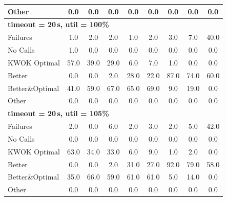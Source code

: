 \begin{tabular}{l cccccccc}
Other & 0.0 & 0.0 & 0.0 & 0.0 & 0.0 & 0.0 & 0.0 & 0.0 \\
\midrule
\multicolumn{9}{l}{\textbf{timeout = 20\,s, util = 100\%}} \\
\midrule
Failures & 1.0 & 2.0 & 2.0 & 1.0 & 2.0 & 3.0 & 7.0 & 40.0 \\
No Calls & 1.0 & 0.0 & 0.0 & 0.0 & 0.0 & 0.0 & 0.0 & 0.0 \\
KWOK Optimal & 57.0 & 39.0 & 29.0 & 6.0 & 7.0 & 1.0 & 0.0 & 0.0 \\
Better & 0.0 & 0.0 & 2.0 & 28.0 & 22.0 & 87.0 & 74.0 & 60.0 \\
Better\&Optimal & 41.0 & 59.0 & 67.0 & 65.0 & 69.0 & 9.0 & 19.0 & 0.0 \\
Other & 0.0 & 0.0 & 0.0 & 0.0 & 0.0 & 0.0 & 0.0 & 0.0 \\
\midrule
\multicolumn{9}{l}{\textbf{timeout = 20\,s, util = 105\%}} \\
\midrule
Failures & 2.0 & 0.0 & 6.0 & 2.0 & 3.0 & 2.0 & 5.0 & 42.0 \\
No Calls & 0.0 & 0.0 & 0.0 & 0.0 & 0.0 & 0.0 & 0.0 & 0.0 \\
KWOK Optimal & 63.0 & 34.0 & 33.0 & 6.0 & 9.0 & 1.0 & 2.0 & 0.0 \\
Better & 0.0 & 0.0 & 2.0 & 31.0 & 27.0 & 92.0 & 79.0 & 58.0 \\
Better\&Optimal & 35.0 & 66.0 & 59.0 & 61.0 & 61.0 & 5.0 & 14.0 & 0.0 \\
Other & 0.0 & 0.0 & 0.0 & 0.0 & 0.0 & 0.0 & 0.0 & 0.0 \\
\bottomrule
\end{tabular}
